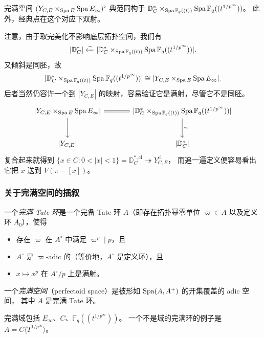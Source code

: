\begin{lemma}
完满空间 $(Y_{C,E}\times_{\operatorname{Spa} E}\operatorname{Spa} E_\infty)^\flat$ 典范同构于
$\mathbb{D}^*_C\times_{\operatorname{Spa}\mathbb{F}_q((t))}\operatorname{Spa}\mathbb{F}_q((t^{1/p^\infty}))$。
此外，经典点在这个对应下双射。
\end{lemma}


注意，由于取完美化不影响底层拓扑空间，我们有
\[
|\mathbb{D}^*_C|\xleftarrow{\sim}
|\mathbb{D}^*_C\times_{\operatorname{Spa}\mathbb{F}_q((t))}\operatorname{Spa}\mathbb{F}_q((t^{1/p^\infty}))| .
\]
又倾斜是同胚，故
\[
|\mathbb{D}^*_C\times_{\operatorname{Spa}\mathbb{F}_q((t))}\operatorname{Spa}\mathbb{F}_q((t^{1/p^\infty}))|
\cong|Y_{C,E}\times_{\operatorname{Spa} E}\operatorname{Spa} E_\infty| .
\]
后者当然仍容许一个到 $|Y_{C,E}|$ 的映射，容易验证它是满射，尽管它不是同胚。
\[
\begin{tikzcd}[column sep=large, row sep=large]
{|Y_{C,E}\times_{\Spa E}\Spa E_\infty|} \arrow[r, equal] \arrow[d]
  & {|\mathbb{D}^*_C\times_{\Spa\mathbb{F}_q((t))}\Spa\mathbb{F}_q((t^{1/p^\infty}))|}
    \arrow[d, "\sim"] \\
{|Y_{C,E}|} & {|\mathbb{D}^*_C|}
\end{tikzcd}
\]
复合起来就得到 $\{x\in C: 0<|x|<1\}=\mathbb{D}^{*,\mathrm{cl}}_C\twoheadrightarrow Y^{\mathrm{cl}}_{C,E}$，
而追一遍定义便容易看出它把 $x$ 送到 $V(\pi-[x])$。

\subsubsection{关于完满空间的插叙}

\begin{definition}
一个\emph{完满 Tate 环}是一个完备 Tate 环 $A$（即存在拓扑幂零单位 $\varpi\in A$
以及定义环 $A_0$），使得
\begin{itemize}
  \item 存在 $\varpi$ 在 $A^\circ$ 中满足 $\varpi^p\mid p$，且
  \item $A^\circ$ 是 $\varpi$-adic 的（等价地，$A^\circ$ 是定义环），且
  \item $x\mapsto x^p$ 在 $A^\circ/p$ 上是满射。
\end{itemize}
一个\emph{完满空间}（perfectoid space）是被形如 $\operatorname{Spa}(A,A^+)$ 的开集覆盖的 adic 空间，
其中 $A$ 是完满 Tate 环。
\end{definition}

\begin{example}
完满域包括 $E_\infty$、$C$、$\mathbb{F}_q((t^{1/p^\infty}))$。
一个不是域的完满环的例子是 $A=C\langle T^{1/p^\infty}\rangle$。
\end{example}

